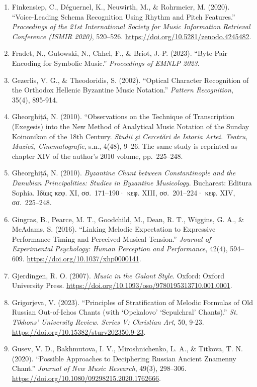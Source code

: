 \documentclass[11pt,a4paper]{article}
\begin{document}
\begin{enumerate}
\item
 Finkensiep, C., Déguernel, K., Neuwirth, M., \& Rohrmeier, M. (2020). ``Voice-Leading Schema Recognition Using Rhythm and Pitch Features.'' \emph{Proceedings of the 21st International Society for Music Information Retrieval Conference (ISMIR 2020)}, 520--526. \url{https://doi.org/10.5281/zenodo.4245482}.
\item
 Fradet, N., Gutowski, N., Chhel, F., \& Briot, J.-P. (2023). ``Byte Pair Encoding for Symbolic Music.'' \emph{Proceedings of EMNLP 2023}.
\item
 Gezerlis, V. G., \& Theodoridis, S. (2002). ``Optical Character Recognition of the Orthodox Hellenic Byzantine Music Notation.'' \emph{Pattern Recognition}, 35(4), 895-914.
\item
 Gheorghiță, N. (2010). ``Observations on the Technique of Transcription (Exegesis) into the New Method of Analytical Music Notation of the Sunday Koinonikon of the 18th Century. \emph{Studii şi Cercetări de Istoria Artei. Teatru, Muzică, Cinematografie}, s.n., 4(48), 9--26. The same study is reprinted as chapter XIV of the author's 2010 volume, pp.~225--248.
\item
 Gheorghiță, N. (2010). \emph{Byzantine Chant between Constantinople and the Danubian Principalities: Studies in Byzantine Musicology}. Bucharest: Editura Sophia. Ιδίως κεφ. XI, σσ.~171--190· κεφ. XIII, σσ.~201--224· κεφ. XIV, σσ.~225--248.
\item
 Gingras, B., Pearce, M. T., Goodchild, M., Dean, R. T., Wiggins, G. A., \& McAdams, S. (2016). ``Linking Melodic Expectation to Expressive Performance Timing and Perceived Musical Tension.'' \emph{Journal of Experimental Psychology: Human Perception and Performance}, 42(4), 594--609. \url{https://doi.org/10.1037/xhp0000141}.
\item
 Gjerdingen, R. O. (2007). \emph{Music in the Galant Style}. Oxford: Oxford University Press. \url{https://doi.org/10.1093/oso/9780195313710.001.0001}.
\item
 Grigorjeva, V. (2023). ``Principles of Stratification of Melodic Formulas of Old Russian Out-of-Ichos Chants (with `Opekalovo' `Sepulchral' Chants).'' \emph{St. Tikhons' University Review. Series V: Christian Art}, 50, 9-23. \url{https://doi.org/10.15382/sturv202350.9-23}.
\item
 Gusev, V. D., Bakhmutova, I. V., Miroshnichenko, L. A., \& Titkova, T. N. (2020). ``Possible Approaches to Deciphering Russian Ancient Znamenny Chant.'' \emph{Journal of New Music Research}, 49(3), 298--306. \url{https://doi.org/10.1080/09298215.2020.1762666}.

\end{enumerate}
\end{document}
